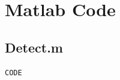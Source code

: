 \documentclass[a4paper,12pt]{article}
\renewcommand{\thesubsection}{\arabic{section}.\arabic{subsection}}
\begin{document}



\clearpage
\renewcommand{\thesubsection}{\arabic{subsection}}
\section*{Matlab Code}
\setcounter{subsection}{0}
\subsection{Detect.m}
\begin{verbatim}
CODE
\end{verbatim}






\end{document}
